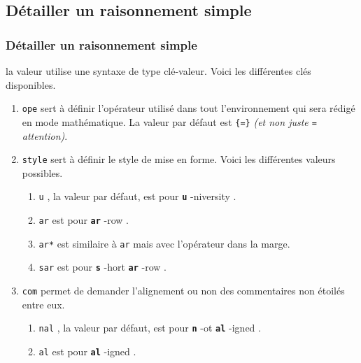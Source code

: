 \documentclass[12pt,a4paper]{article}
\theoremstyle{definition}
\newcommand\whyprefix[2]{%
    \textbf{\prefix{#1}}-#2%
}
\newcommand\prefix[1]{%
    \texttt{#1}%
}
\begin{document}
\subsection{Détailler un raisonnement simple}



\subsubsection{Détailler un raisonnement simple} 


\IDoption{} la valeur utilise une syntaxe de type clé-valeur. Voici les différentes clés disponibles.

\begin{enumerate}
	\item \verb+ope+ sert à définir l'opérateur utilisé dans tout l'environnement qui sera rédigé en mode mathématique. 
	      La valeur par défaut est \verb+{=}+ \emph{(et non juste \texttt{=} attention)}.

	\item \verb+style+ sert à définir le style de mise en forme. Voici les différentes valeurs possibles.
	      \begin{enumerate}
	      		\item \prefix{u}, la valeur par défaut, est pour \whyprefix{u}{niversity}.

	      		\item \prefix{ar} est pour \whyprefix{ar}{row}.

	      		\item \prefix{ar*} est similaire à \prefix{ar}  mais avec l'opérateur dans la marge.

	      		\item \prefix{sar} est pour \whyprefix{s}{hort} \whyprefix{ar}{row}.
	      \end{enumerate}

	\item \verb+com+ permet de demander l'alignement ou non des commentaires non étoilés entre eux.
	      \begin{enumerate}
	      		\item \prefix{nal}, la valeur par défaut, est pour \whyprefix{n}{ot} \whyprefix{al}{igned}.

	      		\item \prefix{al} est pour \whyprefix{al}{igned}.

	      \end{enumerate}
\end{enumerate}
\end{document}
